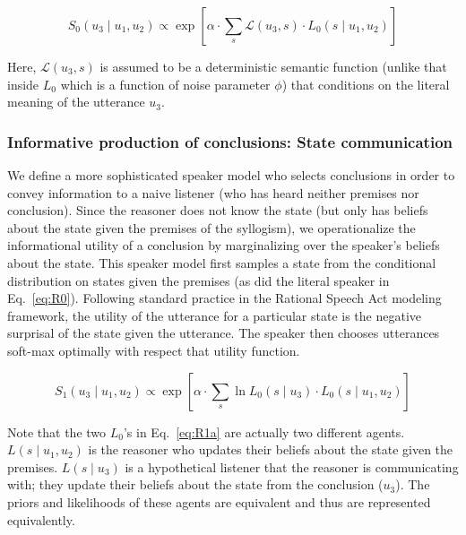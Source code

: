\documentclass[floatsintext, doc]{apa6}
\newcommand{\mht}[1]{{\textcolor{Blue}{[mht: #1]}}}
\newcommand{\ndg}[1]{{\textcolor{Green}{[ndg: #1]}}}
\begin{document}
\begin{equation}
S_0(u_3 \mid u_1, u_2) \propto \exp[ \alpha \cdot \sum_s \mathcal{L}(u_3, s) \cdot L_0(s \mid u_1, u_2)] \label{eq:R0}
\end{equation}

Here, $\mathcal{L}(u_3, s)$ is assumed to be a deterministic semantic function (unlike that inside $L_0$ which is a function of noise parameter $\phi$) that conditions on the literal meaning of the utterance $u_3$.

\subsubsection{Informative production of conclusions: State communication}

We define a more sophisticated speaker model who selects conclusions in order to convey information to a naive listener (who has heard neither premises nor conclusion). 
Since the reasoner does not know the state (but only has beliefs about the state given the premises of the syllogism), we operationalize the informational utility of a conclusion by marginalizing over the speaker's beliefs about the state.
This speaker model first samples a state from the conditional distribution on states given the premises (as did the literal speaker in Eq.~\ref{eq:R0}).
Following standard practice in the Rational Speech Act modeling framework, the utility of the utterance for a particular state is the negative surprisal of the state given the utterance.
The speaker then chooses utterances soft-max optimally with respect that utility function.

\begin{equation}
S_1(u_3 \mid u_1, u_2) \propto \exp{ [ \alpha \cdot  \sum_s  \ln L_0(s \mid u_3) \cdot L_0(s \mid u_1, u_2) ] } \label{eq:R1a}
\end{equation}

Note that the two $L_0$'s in Eq.~\ref{eq:R1a} are actually two different agents.
$L(s \mid u_1, u_2)$ is the reasoner who updates their beliefs about the state given the premises.
$L(s \mid u_3)$ is a hypothetical listener that the reasoner is communicating with; they update their beliefs about the state from the conclusion ($u_3$).
The priors and likelihoods of these agents are equivalent and thus are represented equivalently. 

\end{document}
